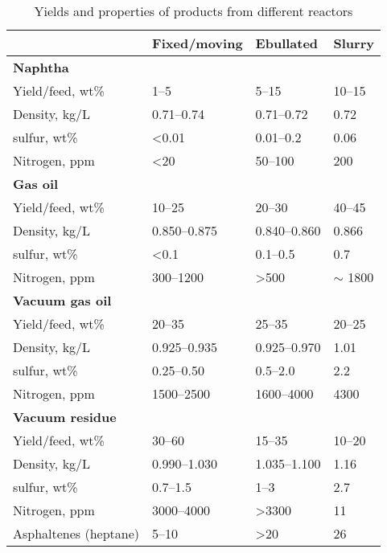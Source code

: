 \begin{table}[t]
\centering
\caption{Yields and properties of products from different reactors}
\label{tab:reactoryields}
\begin{tabular}{@{}llll@{}}
\toprule
                        & \textbf{Fixed/moving} & \textbf{Ebullated} & \textbf{Slurry} \\ \midrule
\textbf{Naphtha}        &                       &                    &                 \\
Yield/feed, wt\%        & 1--5                   & 5--15               & 10--15           \\
Density, kg/L           & 0.71--0.74             & 0.71--0.72          & 0.72            \\
sulfur, wt\%            & \textless0.01         & 0.01--0.2           & 0.06            \\
Nitrogen, ppm           & \textless20           & 50--100             & 200             \\
\textbf{Gas oil}        &                       &                    &                 \\
Yield/feed, wt\%        & 10--25                 & 20--30              & 40--45           \\
Density, kg/L           & 0.850--0.875           & 0.840--0.860        & 0.866           \\
sulfur, wt\%            & \textless0.1          & 0.1--0.5            & 0.7             \\
Nitrogen, ppm           & 300--1200              & \textgreater500    & $\sim$ 1800           \\
\textbf{Vacuum gas oil} &                       &                    &                 \\
Yield/feed, wt\%        & 20--35                 & 25--35              & 20--25           \\
Density, kg/L           & 0.925--0.935           & 0.925--0.970        & 1.01            \\
sulfur, wt\%            & 0.25--0.50             & 0.5--2.0            & 2.2             \\
Nitrogen, ppm           & 1500--2500             & 1600--4000          & 4300            \\
\textbf{Vacuum residue} &                       &                    &                 \\
Yield/feed, wt\%        & 30--60                 & 15--35              & 10--20           \\
Density, kg/L           & 0.990--1.030           & 1.035--1.100        & 1.16            \\
sulfur, wt\%            & 0.7--1.5               & 1--3                & 2.7             \\
Nitrogen, ppm           & 3000--4000             & \textgreater3300   & 11              \\
Asphaltenes (heptane)   & 5--10                  & \textgreater20     & 26              \\ \bottomrule
\end{tabular}
\end{table}

